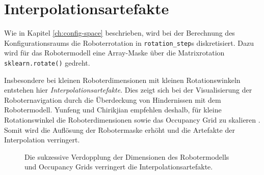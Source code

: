 \vspace*{0.1cm}
\section{Interpolationsartefakte}

Wie in Kapitel \ref{ch:config-space} beschrieben, wird bei der Berechnung des Konfigurationsraums die Roboterrotation in \texttt{rotation\_step}s diskretisiert. Dazu wird für das Robotermodell eine Array-Maske über die Matrixrotation \texttt{sklearn.rotate()} gedreht. 

Insbesondere bei kleinen Roboterdimensionen mit kleinen Rotationswinkeln entstehen hier \textit{Interpolationsartefakte}.
Dies zeigt sich bei der Visualisierung der Roboternavigation durch die Überdeckung von Hindernissen mit dem Robotermodell. Yunfeng und Chirikjian empfehlen deshalb, für kleine Rotationswinkel die Roboterdimensionen sowie das Occupancy Grid zu skalieren \cite{yujiang.2017}.
Somit wird die Auflösung der Robotermaske erhöht und die Artefakte der Interpolation verringert.
\vspace*{0.5cm}
\begin{figure}[h!]
	\footnotesize
	\centering
	\hspace*{-0.1\linewidth}
	\centerline{}
	\hspace*{-0.1\linewidth}
	\vspace*{0.3cm}
	\caption{Die sukzessive Verdopplung der Dimensionen des Robotermodells und Occupancy Grids verringert die Interpolationsartefakte.}
\end{figure}







